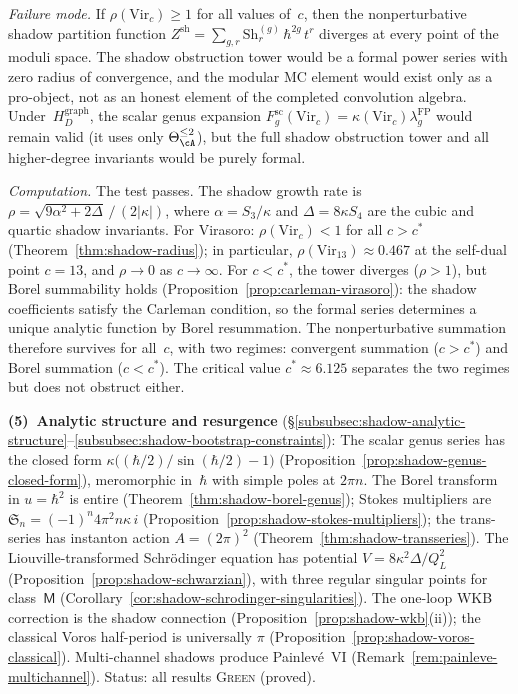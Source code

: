 \smallskip\noindent
\emph{Failure mode.}\enspace
If $\rho(\mathrm{Vir}_c) \geq 1$ for all values
of~$c$, then the nonperturbative shadow partition
function
$Z^{\mathrm{sh}} = \sum_{g,r}
\mathrm{Sh}_r^{(g)} \, \hbar^{2g} \, t^r$
diverges at every point of the moduli space.
The shadow obstruction tower would be a formal
power series with zero radius of convergence,
and the modular MC element would exist only as
a pro-object, not as an honest element of the
completed convolution algebra.
	Under~$H_D^{\mathrm{graph}}$, the scalar genus expansion
	$F_g^{\mathrm{sc}}(\mathrm{Vir}_c) =
	\kappa(\mathrm{Vir}_c)\lambda_g^{\mathrm{FP}}$
	would remain valid (it uses only
$\Theta_\cA^{\le 2}$),
but the full shadow obstruction tower and all
higher-degree invariants would be
purely formal.

\smallskip\noindent
\emph{Computation.}\enspace
The test passes.
The shadow growth rate is
$\rho = \sqrt{9\alpha^2 + 2\Delta}\,/\,(2|\kappa|)$,
where $\alpha = S_3/\kappa$ and
$\Delta = 8\kappa S_4$ are the cubic and quartic
shadow invariants. For Virasoro:
$\rho(\mathrm{Vir}_c) < 1$ for all $c > c^*$
(Theorem~\ref{thm:shadow-radius}); in particular,
$\rho(\mathrm{Vir}_{13}) \approx 0.467$ at the
self-dual point $c = 13$, and
$\rho \to 0$ as $c \to \infty$.
For $c < c^*$, the tower diverges
($\rho > 1$), but Borel summability holds
(Proposition~\ref{prop:carleman-virasoro}):
the shadow coefficients satisfy the Carleman
condition, so the formal series determines a
unique analytic function by Borel resummation.
The nonperturbative summation therefore survives
for all~$c$, with two regimes:
convergent summation ($c > c^*$)
and Borel summation ($c < c^*$).
The critical value $c^* \approx 6.125$ separates
the two regimes but does not obstruct either.

\smallskip\noindent
\textbf{(5)~Analytic structure and resurgence}
(\S\ref{subsubsec:shadow-analytic-structure}--\ref{subsubsec:shadow-bootstrap-constraints}):
The scalar genus series has the closed form
$\kappa\bigl((\hbar/2)/\sin(\hbar/2) - 1\bigr)$
(Proposition~\ref{prop:shadow-genus-closed-form}),
meromorphic in~$\hbar$ with simple poles at $2\pi n$.
The Borel transform in $u = \hbar^2$ is entire
(Theorem~\ref{thm:shadow-borel-genus}); Stokes
multipliers are $\mathfrak{S}_n = (-1)^n 4\pi^2 n\kappa\,i$
(Proposition~\ref{prop:shadow-stokes-multipliers});
the trans-series has instanton action $A = (2\pi)^2$
(Theorem~\ref{thm:shadow-transseries}).
The Liouville-transformed Schr\"odinger equation has
potential $V = 8\kappa^2\Delta/Q_L^2$
(Proposition~\ref{prop:shadow-schwarzian}), with three
regular singular points for class~$\mathsf{M}$
(Corollary~\ref{cor:shadow-schrodinger-singularities}).
The one-loop WKB correction is the shadow connection
(Proposition~\ref{prop:shadow-wkb}(ii)); the classical
Voros half-period is universally $\pi$
(Proposition~\ref{prop:shadow-voros-classical}).
Multi-channel shadows produce
Painlev\'e~VI (Remark~\ref{rem:painleve-multichannel}).
Status: all results \textsc{Green} (proved).

